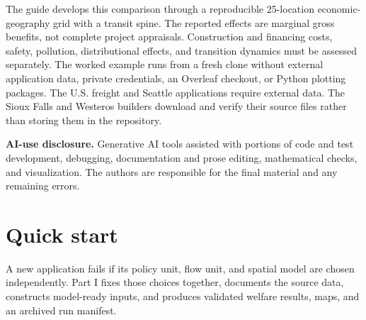 \documentclass[11pt]{article}
\begin{document}
\begin{titlepage}
\begin{minipage}{0.93\textwidth}
\vspace{0.7em}
The guide develops this comparison through a reproducible 25-location
economic-geography grid with a transit spine. The reported effects are marginal
gross benefits, not complete project appraisals. Construction and financing
costs, safety, pollution, distributional effects, and transition dynamics must
be assessed separately. The worked example runs from a fresh clone without
external application data, private credentials, an Overleaf checkout, or
Python plotting packages. The U.S. freight and Seattle applications require
external data. The Sioux Falls and Westeros builders download and verify their
source files rather than storing them in the repository.

\vspace{0.7em}
{\footnotesize\textbf{AI-use disclosure.} Generative AI tools assisted with
portions of code and test development, debugging, documentation and prose
editing, mathematical checks, and visualization. The authors are responsible
for the final material and any remaining errors.\par}
\end{minipage}
\vfill
\noindent{\color{guideblue}\rule{\textwidth}{0.7pt}\par}
\end{titlepage}

\hypersetup{pageanchor=true}
\pagestyle{plain}
\setcounter{tocdepth}{2}
\begingroup
\small
{}
\setlength{\cftbeforesecskip}{0.14em}
\tableofcontents
\endgroup

\clearpage


\clearpage
{}
\pagestyle{fancy}

\part{Quick start}
\label{part:quickstart}
A new application fails if its policy unit, flow unit, and spatial model are
chosen independently. Part I fixes those choices together, documents the
source data, constructs model-ready inputs, and produces validated welfare
results, maps, and an archived run manifest.


\clearpage
\end{document}
